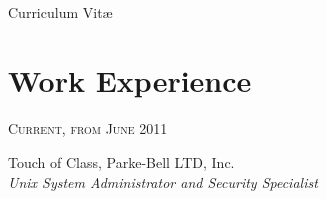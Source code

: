 \documentclass[10pt]{article} %
\begin{document}
\color{text1} %


\par{\\ %
{\color{headings} Curriculum {Vit\ae}\\[15pt]\par}
	

\begin{minipage}[t]{0.5\textwidth}
\vspace{0pt} %
	

\section{Work Experience} 


{\raggedleft\textsc{Current, from June 2011}\par}

{\raggedright\large Touch of Class, Parke-Bell LTD, Inc.\\
\textit{Unix System Administrator and Security Specialist}\\[5pt]}


\end{minipage}}
\end{document}
